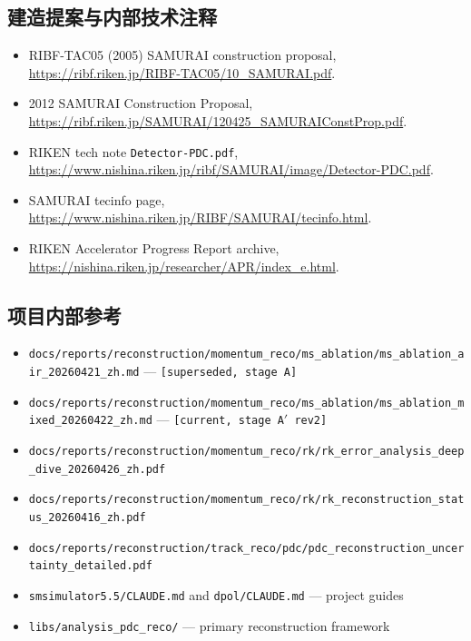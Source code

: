\documentclass[a4paper, 11pt]{article}
\begin{document}
\subsection{建造提案与内部技术注释}
\begin{itemize}
  \item RIBF-TAC05 (2005) SAMURAI construction proposal, \url{https://ribf.riken.jp/RIBF-TAC05/10_SAMURAI.pdf}.
  \item 2012 SAMURAI Construction Proposal, \url{https://ribf.riken.jp/SAMURAI/120425_SAMURAIConstProp.pdf}.
  \item RIKEN tech note \texttt{Detector-PDC.pdf}, \url{https://www.nishina.riken.jp/ribf/SAMURAI/image/Detector-PDC.pdf}.
  \item SAMURAI tecinfo page, \url{https://www.nishina.riken.jp/RIBF/SAMURAI/tecinfo.html}.
  \item RIKEN Accelerator Progress Report archive, \url{https://nishina.riken.jp/researcher/APR/index_e.html}.
\end{itemize}

\subsection{项目内部参考}
\begin{itemize}
  \item \texttt{docs/reports/reconstruction/momentum\_reco/ms\_ablation/ms\_ablation\_air\_20260421\_zh.md} --- \texttt{[superseded, stage A]}
  \item \texttt{docs/reports/reconstruction/momentum\_reco/ms\_ablation/ms\_ablation\_mixed\_20260422\_zh.md} --- \texttt{[current, stage A$'$ rev2]}
  \item \texttt{docs/reports/reconstruction/momentum\_reco/rk/rk\_error\_analysis\_deep\_dive\_20260426\_zh.pdf}
  \item \texttt{docs/reports/reconstruction/momentum\_reco/rk/rk\_reconstruction\_status\_20260416\_zh.pdf}
  \item \texttt{docs/reports/reconstruction/track\_reco/pdc/pdc\_reconstruction\_uncertainty\_detailed.pdf}
  \item \texttt{smsimulator5.5/CLAUDE.md} and \texttt{dpol/CLAUDE.md} --- project guides
  \item \texttt{libs/analysis\_pdc\_reco/} --- primary reconstruction framework
\end{itemize}
\end{document}
